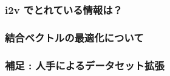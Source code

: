 \newpage
\changeindent{0cm}
\subsubsection{i2v でとれている情報は？}
\changeindent{2cm}

\changeindent{0cm}
\subsubsection{結合ベクトルの最適化について}
\changeindent{2cm}

\changeindent{0cm}
\subsubsection{補足 : 人手によるデータセット拡張}
\changeindent{2cm}

